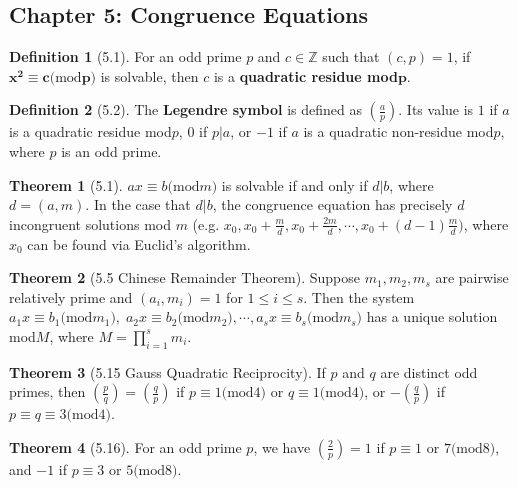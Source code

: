 \documentclass{article}
\newcommand{\Z}{\ensuremath{\mathbb{Z}}}
\newcommand{\Iff}{if and only if}
\renewcommand{\mod}[1]{\ensuremath{(\mathrm{mod}#1})}
\theoremstyle{definition}
\newtheorem*{defn}{Definition}
\newtheorem*{thm}{Theorem}
\theoremstyle{remark}
\begin{document}
    \subsection*{Chapter 5: Congruence Equations}{
        \begin{defn}[5.1]
            For an odd prime $p$ and $c \in \Z$ such that $(c,p)=1$, if $\mathbf{x^2\equiv c\mod{p}}$ is solvable, then $c$ is a \textbf{quadratic residue mod$\mathbf{p}$}.
        \end{defn}
        
        \begin{defn}[5.2]
            The \textbf{Legendre symbol} is defined as $(\frac{a}{p})$. Its value is $1$ if $a$ is a quadratic residue mod$p$, $0$ if $p|a$, or $-1$ if $a$ is a quadratic non-residue mod$p$, where $p$ is an odd prime.
        \end{defn}
        
        \begin{thm}[5.1]
            $ax\equiv b\mod{m}$ is solvable \Iff{} $d|b$, where $d=(a,m)$. In the case that $d|b$, the congruence equation has precisely $d$ incongruent solutions mod $m$ (e.g. $x_0, x_0+\frac{m}{d}, x_0+\frac{2m}{d}, \cdots, x_0+(d-1)\frac{m}{d})$, where $x_0$ can be found via Euclid's algorithm.
        \end{thm}
        
        \begin{thm}[5.5 Chinese Remainder Theorem]
            Suppose $m_1,m_2,m_s$ are pairwise relatively prime and $(a_i,m_i)=1$ for $1\leq i\leq s$. Then the system $a_1x\equiv b_1\mod{m_1}, \; a_2x\equiv b_2\mod{m_2}, \cdots, a_sx\equiv b_s\mod{m_s}$ has a unique solution mod$M$, where $M=\prod_{i=1}^s m_i$.
        \end{thm}
        
        \begin{thm}[5.15 Gauss Quadratic Reciprocity]
            If $p$ and $q$ are distinct odd primes, then $(\frac{p}{q})=(\frac{q}{p})$ if $p\equiv 1 \mod 4$ or $q \equiv 1 \mod 4$, or $-(\frac{q}{p})$ if $p\equiv q\equiv 3 \mod{4}$.
        \end{thm}
        
        \begin{thm}[5.16]
            For an odd prime $p$, we have $(\frac{2}{p})=1$ if $p\equiv 1$ or $7\mod{8}$, and $-1$ if $p\equiv 3$ or $5 \mod{8}$.
        \end{thm}
    
    }
\end{document}

